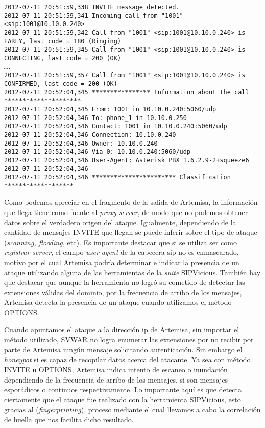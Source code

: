 \documentclass[a4paper,12pt]{report}
\newenvironment{myscriptlisting}
{\begin{list}{}{\setlength{\leftmargin}{1em}}\item\scriptsize\bfseries}
{\end{list}}
\begin{document}
\begin{myscriptlisting}
 \begin{verbatim}
2012-07-11 20:51:59,338 INVITE message detected.
2012-07-11 20:51:59,341 Incoming call from "1001" <sip:1001@10.10.0.240>
2012-07-11 20:51:59,342 Call from "1001" <sip:1001@10.10.0.240> is EARLY, last code = 180 (Ringing)
2012-07-11 20:51:59,345 Call from "1001" <sip:1001@10.10.0.240> is CONNECTING, last code = 200 (OK)
….
2012-07-11 20:51:59,357 Call from "1001" <sip:1001@10.10.0.240> is CONFIRMED, last code = 200 (OK)
2012-07-11 20:52:04,345 **************** Information about the call ********************* 
2012-07-11 20:52:04,345 From: 1001 in 10.10.0.240:5060/udp
2012-07-11 20:52:04,346 To: phone_1 in 10.10.0.250
2012-07-11 20:52:04,346 Contact: 1001 in 10.10.0.240:5060/udp
2012-07-11 20:52:04,346 Connection: 10.10.0.240
2012-07-11 20:52:04,346 Owner: 10.10.0.240
2012-07-11 20:52:04,346 Via 0: 10.10.0.240:5060/udp
2012-07-11 20:52:04,346 User-Agent: Asterisk PBX 1.6.2.9-2+squeeze6
2012-07-11 20:52:04,346 
2012-07-11 20:52:04,346 *********************** Classification *******************
 \end{verbatim}
\end{myscriptlisting}

Como podemos apreciar en el fragmento de la salida de Artemisa, la información 
que llega tiene como fuente al \emph{proxy server}, de modo que no podemos
obtener datos sobre el verdadero origen del ataque. Igualmente, dependiendo de
la cantidad de mensajes INVITE que llegan se puede inferir sobre el tipo de
ataque (\emph{scanning, flooding,} etc).
Es importante destacar que si se utiliza \ac{ser} como 
\emph{registrar server}, el campo \emph{user-agent} de la cabecera \ac{sip} no es
enmascarado, motivo por el cual Artemisa podría determinar  e indicar la
presencia de un ataque utilizando alguna de las herramientas de la \emph{suite}
SIPVicious.
También hay que destacar que aunque la herramienta no logró su cometido de 
detectar las extensiones válidas del dominio, por la frecuencia de arribo de los
mensajes, Artemisa detecta la presencia de un ataque cuando utilizamos el método
OPTIONS.

Cuando apuntamos el ataque a la dirección \ac{ip} de Artemisa, sin importar el método
utilizado, SVWAR no logra enumerar las extensiones por no recibir por parte de
Artemisa ningún mensaje solicitando autenticación. Sin embargo el \emph{honeypot} si es
capaz de recopilar datos acerca del atacante.
Ya sea con método INVITE u OPTIONS, Artemisa indica intento de escaneo o \mbox{inundación}
dependiendo de la frecuencia de arribo de los mensajes, si son
mensajes esporádicos o continuos respectivamente. Lo importante aquí es que
detecta ciertamente que el ataque fue realizado con la herramienta
SIPVicious, esto gracias al (\emph{fingerprinting}), proceso mediante el cual
llevamos a cabo la correlación de huella que nos facilita dicho resultado.
\end{document}
